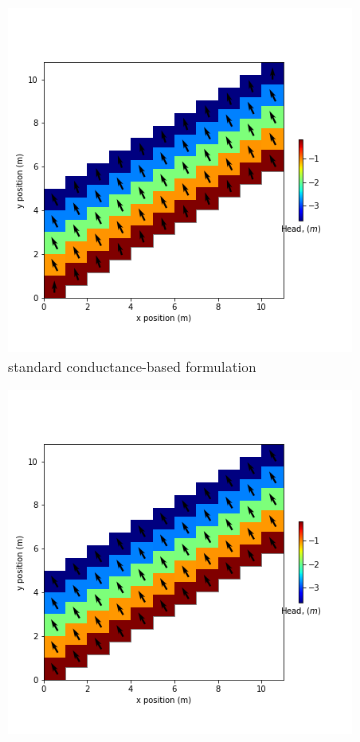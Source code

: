 \documentclass{article}
\begin{document}
\begin{figure}[H]
\centering
\begin{subfigure}{0.4\textwidth}
	\includegraphics[width=\textwidth]{../figures/disu-cf-vs-s-head.png}
	\caption{standard conductance-based formulation}
	\label{fig:disu-s-cc-cf-head}
\end{subfigure}
\hfill
\begin{subfigure}{0.4\textwidth}
	\includegraphics[width=\textwidth]{../figures/disu-cf-vs-x-head.png}

\end{subfigure}
\end{figure}
\end{document}
